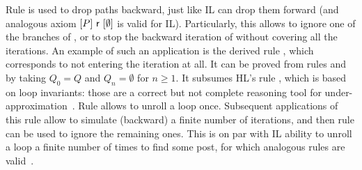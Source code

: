 Rule  is used to drop paths backward, just like IL can drop them forward (and analogous axiom $[P]~\mathsf{r}~[\emptyset]$ is valid for IL). Particularly, this allows to ignore one of the branches of , or to stop the backward iteration of  without covering all the iterations. An example of such an application is the derived rule , which corresponds to not entering the iteration at all. It can be proved from rules  and  by taking $Q_0 = Q$ and $Q_n = \emptyset$ for $n \ge 1$. It subsumes HL's rule , which is based on loop invariants: those are a correct but not complete reasoning tool for under\hyp{}approximation~\cite{OHearn20}.
Rule  allows to unroll a loop once. Subsequent applications of this rule allow to simulate (backward) a finite number of iterations, and then rule  can be used to ignore the remaining ones. This is on par with IL ability to unroll a loop a finite number of times to find some post, for which analogous rules are valid~\cite{OHearn20,MOH21}.

